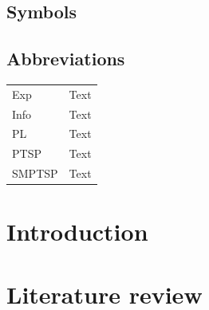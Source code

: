 \documentclass[a4paper, 10pt, twoside, openright]{book}
\begin{document}
\section*{Symbols}


\section*{Abbreviations}

\begin{tabular}{ll}
Exp		& Text\\
Info	& Text\\
PL		& Text\\
PTSP	& Text\\
SMPTSP	& Text\\
\end{tabular}


\tableofcontents 
\begin{samepage}
\listoffigures
\let\clearpage\relax
\listoftables
\end{samepage}


\mainmatter


\chapter{Introduction}




\chapter{Literature review}
\end{document}
